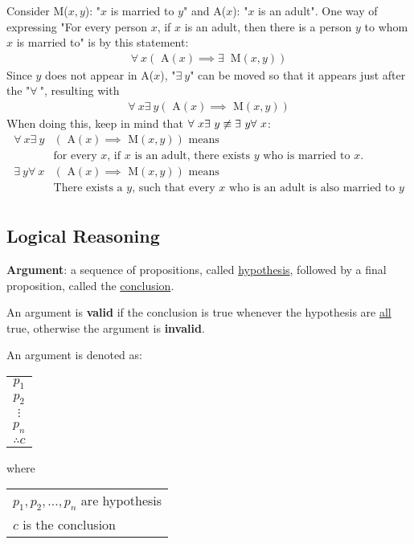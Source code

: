 Consider M($x, y$): "$x$ is married to $y$" and A($x$): "$x$ is an adult".
One way of expressing "For every person $x$, if $x$ is an adult, then
there is a person $y$ to whom $x$ is married to" is by this statement:
\begin{align*}
  \forall~ x (\text{ A}(x) \implies \exists~ \text{ M}(x, y))
\end{align*}
Since $y$ does not appear in A($x$), "$\exists~ y$" can be moved so that it appears
just after the "$\forall~$", resulting with
\begin{align*}
  \forall~ x \exists~ y (\text{ A}(x) \implies \text{ M}(x, y))
\end{align*}
When doing this, keep in mind that $\forall~ x \exists~ y \centernot \equiv \exists~ y \forall~ x$:
\begin{align*}
  \forall~ x \exists~ y & (\text{ A}(x) \implies \text{ M}(x, y)) \text{ means}                                 \\
                      & \text{for every $x$, if $x$ is an adult, there exists $y$ who is married to $x$.}     \\
  \exists~ y \forall~ x & (\text{ A}(x) \implies \text{ M}(x, y)) \text{ means}                                 \\
                      & \text{There exists a $y$, such that every $x$ who is an adult is also married to $y$} \\
\end{align*}

\subsection{Logical Reasoning}

\textbf{Argument}: a sequence of propositions, called \underline{hypothesis}, followed
by a final proposition, called the \underline{conclusion}.

An argument is \textbf{valid} if the conclusion is true whenever the hypothesis
are \underline{all} true, otherwise the argument is \textbf{invalid}.

\begin{center}
  An argument is denoted as:
  \begin{tabular}{c}
    $p_1$     \\
    $p_2$     \\
    $\vdots $ \\
    $p_n$     \\
    \hline
    $\therefore c$
  \end{tabular}
  where
  \begin{tabular}{l}
    $p_1, p_2, \ldots, p_n$ are hypothesis \\
    $c$ is the conclusion
  \end{tabular}
\end{center}

